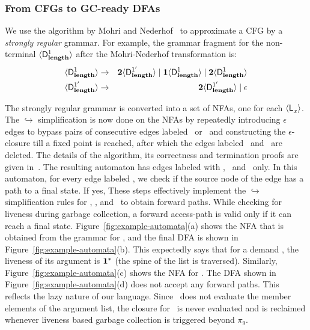 \documentclass[preprint, 9pt]{sigplanconf}
\newcommand{\warning}[1]{{\color{Myred}{#1}}}
\begin{document}
\subsubsection{From CFGs to GC-ready DFAs}
\label{sec:NFA-approx}
 We use  the algorithm by Mohri  and Nederhof~\cite{mohri00regular} to
 approximate a CFG by a {\em strongly regular\/} grammar.  For
 example, the grammar
 fragment  for  the  non-terminal  $\langle \mathsf{D}_{\mathit {\mathbf{length}}}^{1}\rangle$  after  the
 Mohri-Nederhof transformation is:
 \begin{eqnarray*}
   \langle \mathsf{D}_{\mathit {\mathbf{length}}}^{1}\rangle &\rightarrow& {\mathbf{2}}\langle \mathsf{D}_{\mathit {\mathbf{length}}}^{1'}\rangle \mid
   \mathbf{1}\langle \mathsf{D}_{\mathit {\mathbf{length}}}^{1}\rangle
   \mid {\mathbf{2}}\langle \mathsf{D}_{\mathit {\mathbf{length}}}^{1}\rangle\\
   \langle \mathsf{D}_{\mathit {\mathbf{length}}}^{1'}\rangle &\rightarrow& {\mathbf{2}}\langle \mathsf{D}_{\mathit {\mathbf{length}}}^{1'}\rangle
   \mid \epsilon
 \end{eqnarray*}

The strongly regular grammar is converted  into a set of NFAs, one for
each $\langle \mathsf{L}_{{x}}^{}\rangle$.  The  $\hookrightarrow$ simplification is now
done on the NFAs by  repeatedly introducing $\epsilon$ edges to bypass
pairs  of consecutive  edges  labeled \bcar\acar\  or \bcdr\acdr\  and
constructing  the $\epsilon$-closure  till a  fixed point  is reached,
after which  the edges labeled  \bcar \  and \bcdr\ are  deleted.  The
details of the  algorithm, its correctness and  termination proofs are
given  in~\cite{karkare07liveness,asati14lgc}.   The
resulting  automaton   has  edges  labeled  with   \acar,  \acdr\  and
\clazy\ only.  In this  automaton, for every  edge labeled  \clazy, we
check if the source node of the edge has a path to a final 
state.  If yes, \warning{we mark the mark the source node as final. Finally, we
remove all the edges labeled \clazy\  and convert the automaton into a
deterministic    automaton.}    These steps   effectively   implement    the
$\hookrightarrow$   simplification  rules   for   \bcar,  \bcdr,   and
\clazy\ to  obtain forward paths.  While checking for  liveness during
garbage  collection, a  forward access-path  is valid  only if  it can
reach a  final state.  Figure~\ref{fig:example-automata}(a)  shows the
NFA that is obtained from  the grammar for , and   the
final  DFA  is  shown in  Figure~\ref{fig:example-automata}(b).   This
expectedly  says that for a  demand  \warning{$\epsilon$  on  \length},  the
liveness of  its argument  is $\mathbf{1}^{*}$  (the spine  of the  list is
traversed).  Similarly, Figure~\ref{fig:example-automata}(c) shows the
NFA     for     \var{\Lanv{\pa}{}}.      The     DFA     shown     in
Figure~\ref{fig:example-automata}(d)  does  not   accept  any  forward
paths.   This  reflects  the  lazy  nature  of  our  language.   Since
\length\ does not  evaluate the member elements of  the argument list,
the  closure for  \pa\ is  never evaluated  and is  reclaimed whenever
liveness based garbage collection is triggered beyond $\pi_9$.
\end{document}
